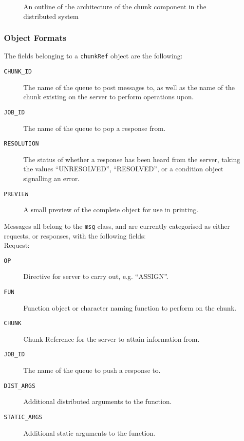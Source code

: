 \begin{figure}
	\caption{\label{fig:chunk-arch} An outline of the architecture of the
	chunk component in the distributed system}
\end{figure}

\newpage
\subsubsection{Object Formats}
The fields belonging to a \texttt{chunkRef} object are the following:
\begin{description}
	\item[\texttt{CHUNK\_ID}] The name of the queue to post messages to, as
		well as the name of the chunk existing on the server to perform
		operations upon.
	\item[\texttt{JOB\_ID}] The name of the queue to pop a response from.
	\item[\texttt{RESOLUTION}] The status of whether a response has been
		heard from the server, taking the values ``UNRESOLVED'',
		``RESOLVED'', or a condition object signalling an error.
	\item[\texttt{PREVIEW}] A small preview of the complete object for use
		in printing.
\end{description}

Messages all belong to the \texttt{msg} class, and are currently categorised as
either requests, or responses, with the following fields:\\

Request:
\begin{description}
	\item[\texttt{OP}] Directive for server to carry out, e.g. ``ASSIGN''.
	\item[\texttt{FUN}] Function object or character naming function to
		perform on the chunk.
	\item[\texttt{CHUNK}] Chunk Reference for the server to attain
		information from.
	\item[\texttt{JOB\_ID}] The name of the queue to push a response to.
	\item[\texttt{DIST\_ARGS}] Additional distributed arguments to the
		function.
	\item[\texttt{STATIC\_ARGS}] Additional static arguments to the
		function.
\end{description}

